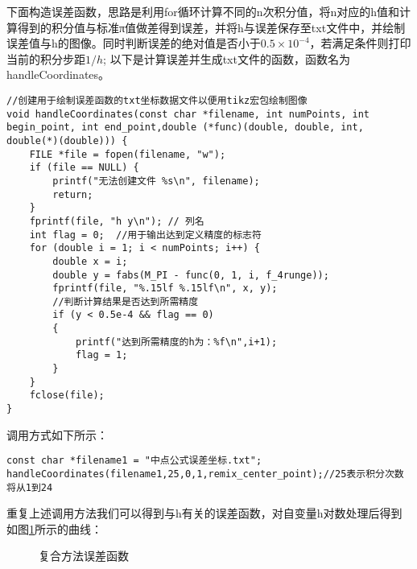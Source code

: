\documentclass{homework}
\begin{document}
下面构造误差函数，思路是利用for循环计算不同的n次积分值，将n对应的h值和计算得到的积分值与标准π值做差得到误差，并将h与误差保存至txt文件中，并绘制误差值与h的图像。同时判断误差的绝对值是否小于$0.5\times10^{-4}$，若满足条件则打印当前的积分步距$1/h$;
以下是计算误差并生成txt文件的函数，函数名为handleCoordinates。
\begin{lstlisting}
//创建用于绘制误差函数的txt坐标数据文件以便用tikz宏包绘制图像
void handleCoordinates(const char *filename, int numPoints, int begin_point, int end_point,double (*func)(double, double, int, double(*)(double))) {
    FILE *file = fopen(filename, "w");
    if (file == NULL) {
        printf("无法创建文件 %s\n", filename);
        return;
    }
    fprintf(file, "h y\n"); // 列名
    int flag = 0;  //用于输出达到定义精度的标志符
    for (double i = 1; i < numPoints; i++) {
        double x = i; 
        double y = fabs(M_PI - func(0, 1, i, f_4runge));
        fprintf(file, "%.15lf %.15lf\n", x, y);
        //判断计算结果是否达到所需精度
        if (y < 0.5e-4 && flag == 0)
        {
            printf("达到所需精度的h为：%f\n",i+1);
            flag = 1;
        }
    }
    fclose(file);
}
\end{lstlisting}
调用方式如下所示：
\begin{lstlisting}
const char *filename1 = "中点公式误差坐标.txt";
handleCoordinates(filename1,25,0,1,remix_center_point);//25表示积分次数将从1到24
\end{lstlisting}
重复上述调用方法我们可以得到与h有关的误差函数，对自变量h对数处理后得到如图\ref{fuhefangfa}所示的曲线：
\begin{figure}[htbp]
    \centering
    \caption{复合方法误差函数}
    \label{fuhefangfa}
  \end{figure}
\end{document}
